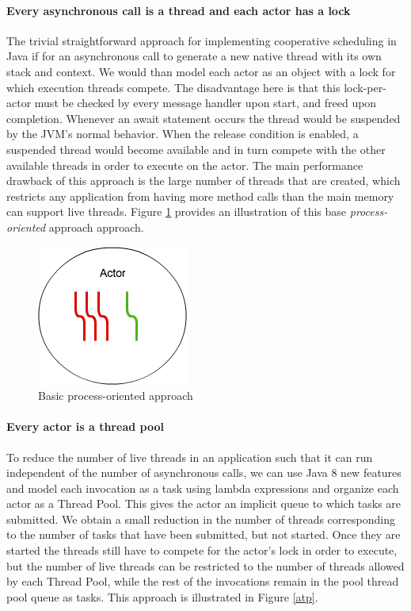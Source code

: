 \paragraph{Every asynchronous call is a thread and each actor has a lock }
The trivial straightforward approach for implementing cooperative scheduling in Java if for an asynchronous call to generate a new native thread with its own stack and context. We would than model each actor as an object with a lock for which execution threads compete. The disadvantage here is that this lock-per-actor must be checked by every message handler upon start, and freed upon completion. Whenever an await statement occurs the thread would be suspended by the JVM's normal behavior. When the release condition is enabled, a suspended thread would become available and in turn compete with the other available threads in order to execute on the actor. The main performance drawback of this approach is the large number of threads that are created, which restricts any application from having more method calls than the main memory can support live threads. Figure \ref{tp} provides an illustration of this base \textit{process-oriented} approach approach.

\begin{figure}
	\label{tp}
	\centering
	\includegraphics[scale=0.7]{mt.png}
	\caption{Basic process-oriented approach}
\end{figure}

\paragraph{Every actor is a thread pool}
To reduce the number of live threads in an application such that it can run independent of the number of asynchronous calls, we can use Java 8 new features and model each invocation as a task using lambda expressions and organize each actor as a Thread Pool. This gives the actor an implicit queue to which tasks are submitted. We obtain a small reduction in the number of threads corresponding to the number of tasks that have been submitted, but not started.  Once they are started the threads still have to compete for the actor's lock in order to execute, but the number of live threads can be restricted to the number of threads allowed by each Thread Pool, while the rest of the invocations remain in the pool thread pool queue as tasks. This approach is illustrated in Figure \ref{atp}. 


